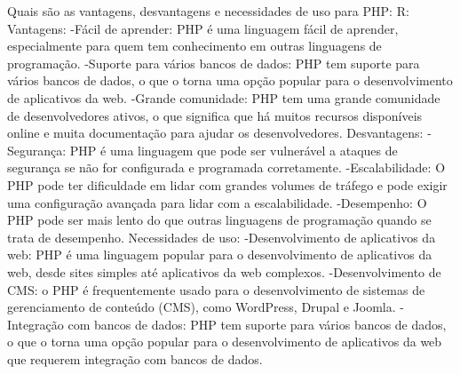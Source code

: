 Quais são as vantagens, desvantagens e necessidades de uso para PHP:
R:
Vantagens:
  -Fácil de aprender: PHP é uma linguagem fácil de aprender, especialmente para quem tem conhecimento em outras linguagens de programação.
  -Suporte para vários bancos de dados: PHP tem suporte para vários bancos de dados, o que o torna uma opção popular para o desenvolvimento de aplicativos da web.
  -Grande comunidade: PHP tem uma grande comunidade de desenvolvedores ativos, o que significa que há muitos recursos disponíveis online e muita documentação para ajudar os desenvolvedores.
Desvantagens:
  -Segurança: PHP é uma linguagem que pode ser vulnerável a ataques de segurança se não for configurada e programada corretamente.
  -Escalabilidade: O PHP pode ter dificuldade em lidar com grandes volumes de tráfego e pode exigir uma configuração avançada para lidar com a escalabilidade.
  -Desempenho: O PHP pode ser mais lento do que outras linguagens de programação quando se trata de desempenho.
Necessidades de uso:
  -Desenvolvimento de aplicativos da web: PHP é uma linguagem popular para o desenvolvimento de aplicativos da web, desde sites simples até aplicativos da web complexos.
  -Desenvolvimento de CMS: o PHP é frequentemente usado para o desenvolvimento de sistemas de gerenciamento de conteúdo (CMS), como WordPress, Drupal e Joomla.
  -Integração com bancos de dados: PHP tem suporte para vários bancos de dados, o que o torna uma opção popular para o desenvolvimento de aplicativos da web que requerem integração com bancos de dados.